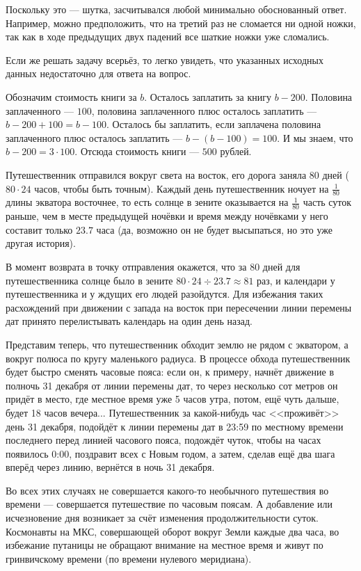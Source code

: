 \begin{itemize}

\itA Поскольку это --- шутка, засчитывался любой минимально обоснованный ответ. 
Например, можно предположить, что на третий раз не сломается ни одной ножки, 
так как в ходе предыдущих двух падений все шаткие ножки уже сломались. 

Если же решать задачу всерьёз, то легко увидеть, что указанных исходных данных
недостаточно для ответа на вопрос. 

\itB Обозначим стоимость книги за $b$. Осталось заплатить за книгу $b - 200$.
Половина заплаченного --- $100$, половина заплаченного плюс осталось заплатить ---
$b - 200 + 100 = b - 100$. Осталось бы заплатить, если заплачена половина 
заплаченного плюс осталось заплатить --- $b - (b - 100) = 100$.
И мы знаем, что $b - 200 = 3 \cdot 100$. Отсюда стоимость книги --- $500$ рублей.

\itC Путешественник отправился вокруг света на восток, его дорога 
заняла $80$ дней ($80 \cdot 24$ часов, чтобы быть точным). 
Каждый день путешественник ночует на $\frac{1}{80}$ длины 
экватора восточнее, то есть солнце в зените оказывается на $\frac{1}{80}$ часть
суток раньше, чем в месте предыдущей ночёвки и время между 
ночёвками у него составит только $23.7$ часа (да, возможно он не будет 
высыпаться, но это уже другая история). 

В момент возврата в точку отправления окажется, что за $80$ дней для путешественника
солнце было в зените $80 \cdot 24 \div 23.7 \approx 81$ раз, и календари у путешественника
и у ждущих его людей разойдутся. Для избежания таких расхождений при движении с запада на восток
при пересечении линии перемены дат принято перелистывать календарь на один день назад.

Представим теперь, что путешественник обходит землю не рядом с экватором, 
а вокруг полюса по кругу маленького радиуса. В процессе обхода путешественник 
будет быстро сменять часовые пояса: если он, к примеру, начнёт движение в полночь 
31 декабря от линии перемены дат, то через несколько сот метров он придёт в место, 
где местное время уже 5 часов утра, потом, ещё чуть дальше, 
будет 18 часов вечера... Путешественник за какой-нибудь час <<проживёт>> день 31 декабря, 
подойдёт к линии перемены дат в 23:59 по местному времени последнего перед 
линией часового пояса, подождёт чуток, чтобы на часах появилось
0:00, поздравит всех с Новым годом, а затем, сделав ещё два шага вперёд 
через линию, вернётся в ночь 31 декабря. 

Во всех этих случаях не совершается какого-то необычного путешествия во 
времени --- совершается путешествие по часовым поясам. 
А добавление или исчезновение 
дня возникает за счёт изменения продолжительности суток. Космонавты на МКС,
совершающей оборот вокруг Земли каждые два часа, во избежание путаницы не
обращают внимание на местное время и живут по гринвичскому времени (по времени
нулевого меридиана).
\end{itemize}
